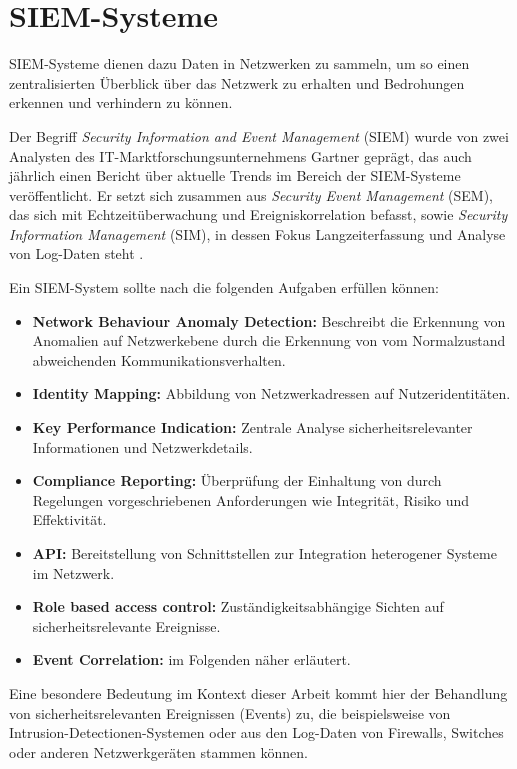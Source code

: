 \section{SIEM-Systeme}

\label{sec_basics_siem}

SIEM-Systeme dienen dazu Daten in Netzwerken zu sammeln, um so einen zentralisierten Überblick über das Netzwerk zu erhalten und Bedrohungen erkennen und verhindern zu können. 

Der Begriff \textit{Security Information and Event Management} (SIEM) wurde von zwei Analysten des IT-Marktforschungsunternehmens Gartner geprägt, das auch jährlich einen Bericht über aktuelle Trends im Bereich der SIEM-Systeme veröffentlicht.
Er setzt sich zusammen aus \textit{Security Event Management} (SEM), das sich mit Echtzeitüberwachung und Ereigniskorrelation befasst, sowie \textit{Security Information Management} (SIM), in dessen Fokus Langzeiterfassung und Analyse von Log-Daten steht \cite{gartner2011}. 

Ein SIEM-System sollte nach \cite{detken2015} die folgenden Aufgaben erfüllen können: 
\begin{itemize}
	\item \textbf{Network Behaviour Anomaly Detection:} Beschreibt die Erkennung von Anomalien auf Netzwerkebene durch die Erkennung von vom Normalzustand abweichenden Kommunikationsverhalten.
	\item \textbf{Identity Mapping:} Abbildung von Netzwerkadressen auf Nutzeridentitäten. 
	\item \textbf{Key Performance Indication:} Zentrale Analyse sicherheitsrelevanter Informationen und Netzwerkdetails.
	\item \textbf{Compliance Reporting:} Überprüfung der Einhaltung von durch Regelungen vorgeschriebenen Anforderungen wie Integrität, Risiko und Effektivität.
	\item \textbf{API:} Bereitstellung von Schnittstellen zur Integration heterogener Systeme im Netzwerk.
	\item \textbf{Role based access control:} Zuständigkeitsabhängige Sichten auf sicherheitsrelevante Ereignisse.
  \item \textbf{Event Correlation:} im Folgenden näher erläutert.
\end{itemize} 

Eine besondere Bedeutung im Kontext dieser Arbeit kommt hier der Behandlung von sicherheitsrelevanten Ereignissen (Events) zu, die beispielsweise von Intrusion-Detectionen-Systemen oder aus den Log-Daten von Firewalls, Switches oder anderen Netzwerkgeräten stammen können. 

